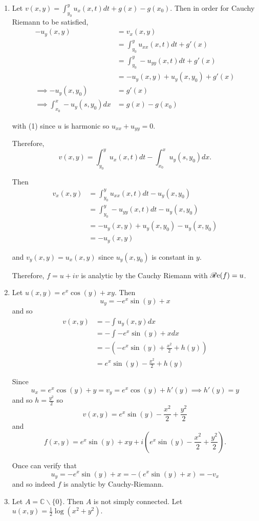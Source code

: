 \documentclass[12pt]{Qual}
\begin{document}
\begin{solution}$\,$
\begin{enumerate}[label=(\alph*)]
    \item Let $v(x,y)=\int_{y_0}^yu_x(x,t)dt+g(x)-g(x_0).$ Then in order for Cauchy Riemann to be satisfied, \begin{align*}
        -u_y(x,y)&=v_x(x,y)\\
        &=\int_{y_0}^yu_{xx}(x,t)dt+g'(x)\\
        &=\int_{y_0}^y-u_{yy}(x,t)dt+g'(x)\tag{1}\\
        &=-u_y(x,y)+u_y(x,y_0)+g'(x)\\
        \implies -u_y(x,y_0)&=g'(x)\\
        \implies \int_{x_0}^x-u_y(s,y_0)dx&=g(x)-g(x_0)
    \end{align*}

    with (1) since $u$ is harmonic so $u_{xx}+u_{yy}=0$.

    Therefore, $$v(x,y)=\int_{y_0}^yu_x(x,t)dt-\int_{x_0}^xu_y(s,y_0)dx.$$

    Then \begin{align*}
        v_x(x,y)&=\int_{y_0}^yu_{xx}(x,t)dt-u_y(x,y_0)\\
        &=\int_{y_0}^y-u_{yy}(x,t)dt-u_y(x,y_0)\\
        &=-u_y(x,y)+u_y(x,y_0)-u_y(x,y_0)\\\
        &=-u_y(x,y)
    \end{align*}

    and $v_y(x,y)=u_x(x,y)$ since $u_y(x,y_0)$ is constant in $y$.

    Therefore, $f=u+iv$ is analytic by the Cauchy Riemann with $\mathscr{R}\text{e}(f)=u$.
    \item Let $u(x,y)=e^x\cos(y)+xy$. Then $$u_y=-e^x\sin(y)+x$$ and so \begin{align*}
        v(x,y)&=-\int u_y(x,y)dx\\
        &=-\int-e^x\sin(y)+xdx\\
        &=-\left(-e^x\sin(y)+\frac{x^2}{2}+h(y)\right)\\
        &=e^x\sin(y)-\frac{x^2}{2}+h(y)
    \end{align*}

    Since $$u_x=e^x\cos(y)+y=v_y=e^x\cos(y)+h'(y)\implies h'(y)=y$$ and so $h=\frac{y^2}{2}$ so $$v(x,y)=e^x\sin(y)-\frac{x^2}{2}+\frac{y^2}{2}$$ and $$f(x,y)=e^x\sin(y)+xy+i(e^x\sin(y)-\frac{x^2}{2}+\frac{y^2}{2}).$$

    Once can verify that $$u_y=-e^x\sin(y)+x=-(e^x\sin(y)+x)=-v_x$$ and so indeed $f$ is analytic by Cauchy-Riemann.
    \item Let $A=\mathbb{C}\backslash\{0\}$. Then $A$ is not simply connected. Let $u(x,y)=\frac{1}{2}\log(x^2+y^2).$


\end{enumerate}
\end{solution}
\end{document}
